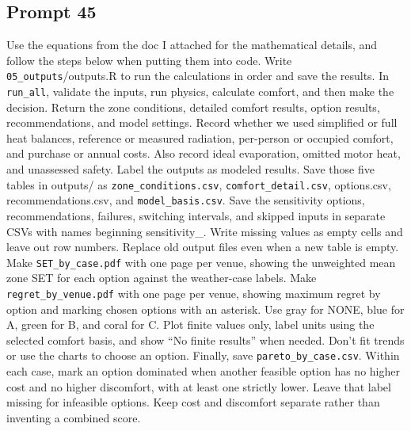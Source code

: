 \subsection*{Prompt 45}
Use the equations from the doc I attached for the mathematical details, and follow the steps below when putting them into code. Write \nolinkurl{05_outputs}/outputs.R to run the calculations in order and save the results. In \nolinkurl{run_all}, validate the inputs, run physics, calculate comfort, and then make the decision. Return the zone conditions, detailed comfort results, option results, recommendations, and model settings.
Record whether we used simplified or full heat balances, reference or measured radiation, per-person or occupied comfort, and purchase or annual costs. Also record ideal evaporation, omitted motor heat, and unassessed safety. Label the outputs as modeled results.
Save those five tables in outputs/ as \nolinkurl{zone_conditions.csv}, \nolinkurl{comfort_detail.csv}, options.csv, recommendations.csv, and \nolinkurl{model_basis.csv}. Save the sensitivity options, recommendations, failures, switching intervals, and skipped inputs in separate CSVs with names beginning sensitivity\_. Write missing values as empty cells and leave out row numbers. Replace old output files even when a new table is empty.
Make \nolinkurl{SET_by_case.pdf} with one page per venue, showing the unweighted mean zone SET for each option against the weather-case labels. Make \nolinkurl{regret_by_venue.pdf} with one page per venue, showing maximum regret by option and marking chosen options with an asterisk. Use gray for NONE, blue for A, green for B, and coral for C. Plot finite values only, label units using the selected comfort basis, and show “No finite results” when needed. Don’t fit trends or use the charts to choose an option.
Finally, save \nolinkurl{pareto_by_case.csv}. Within each case, mark an option dominated when another feasible option has no higher cost and no higher discomfort, with at least one strictly lower. Leave that label missing for infeasible options. Keep cost and discomfort separate rather than inventing a combined score.


